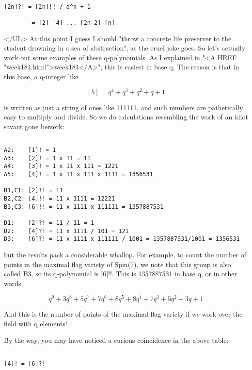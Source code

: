 \begin{verbatim}

[2n]?! = [2n]!! / q^n + 1

        = [2] [4] ... [2n-2] [n]
\end{verbatim}
    
</UL>
At this point I guess I should "throw a concrete life preserver to
the student drowning in a sea of abstraction", as the cruel joke
goes.  So let's actually work out some examples of these q-polynomials.
As I explained in "<A HREF = "week184.html">week184</A>", this
is easiest in base q.  The reason is that in this base, a q-integer like


$$

[5] = q^{4} + q^{3} + q^{2} + q + 1
$$
    
is written as just a string of ones like 111111, and such numbers 
are pathetically easy to multiply and divide.  So we do calculations
resembling the work of an idiot savant gone berserk:


\begin{verbatim}

A2:    [1]! = 1
A3:    [2]! = 1 x 11 = 11
A4:    [3]! = 1 x 11 x 111 = 1221
A5:    [4]! = 1 x 11 x 111 x 1111 = 1356531

B1,C1: [2]!! = 11
B2,C2: [4]!! = 11 x 1111 = 12221
B3,C3: [6]!! = 11 x 1111 x 111111 = 1357887531

D1:    [2]?! = 11 / 11 = 1
D2:    [4]?! = 11 x 1111 / 101 = 121
D3:    [6]?! = 11 x 1111 x 111111 / 1001 = 1357887531/1001 = 1356531
\end{verbatim}
    
but the results pack a considerable whallop.  For example, to count
the number of points in the maximal flag variety of Spin(7), we note 
that this group is also called B3, so its q-polynomial is [6]!!.  This 
is 1357887531 in base q, or in other words:


$$

q^{9} + 3q^{8} + 5q^{7} + 7q^{6} + 8q^{5} + 8q^{4} + 7q^{3} + 5q^{2} + 3q + 1 
$$
    
And this is the number of points of the maximal flag variety if
we work over the field with q elements!  

By the way, you may have noticed a curious coincidence in the 
above table: 


\begin{verbatim}

[4]! = [6]?!
\end{verbatim}
    
